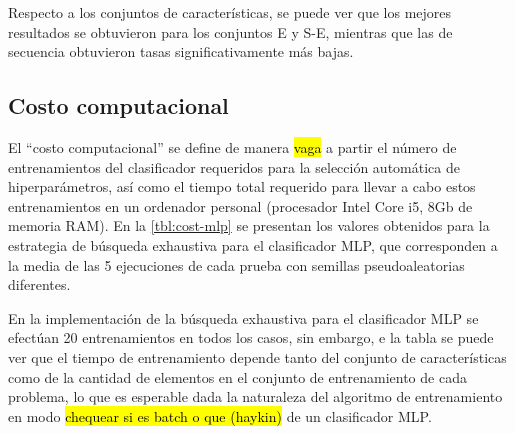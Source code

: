 Respecto a los conjuntos de características, se puede ver que los
mejores resultados se obtuvieron para los conjuntos E y S-E, mientras
que las  de secuencia obtuvieron tasas significativamente
más bajas.
%
%
\subsection{Costo computacional}
%
El ``costo computacional'' se define de manera \hl{vaga} a partir el
número de entrenamientos del clasificador requeridos para la selección
automática de hiperparámetros, así como el tiempo total requerido para
llevar a cabo estos entrenamientos en un ordenador personal
(procesador Intel Core i5, 8\si{\giga b} de memoria RAM).  En la
\autoref{tbl:cost-mlp} se presentan los valores obtenidos para la
estrategia de búsqueda exhaustiva para el clasificador MLP, que
corresponden a la media de las 5 ejecuciones de cada prueba con
semillas pseudoaleatorias diferentes.

En la implementación de la búsqueda exhaustiva para el clasificador
MLP se efectúan 20 entrenamientos en todos los casos, sin embargo,
e la tabla se puede ver que el tiempo de entrenamiento
depende tanto del conjunto de características como de la
cantidad de elementos en el conjunto de entrenamiento de cada
problema, lo que es esperable dada la naturaleza del algoritmo
de entrenamiento en modo  \hl{chequear si es batch o que (haykin)}
de un clasificador MLP.
